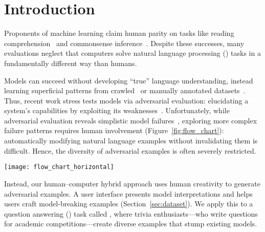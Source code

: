 \section{Introduction}
\label{sec:introduction}

Proponents of machine learning claim human
parity on tasks like reading comprehension~\cite{yu2018qanet}
and commonsense
inference~\cite{devlin2018BERT}. Despite these successes,
many evaluations neglect that computers solve natural language
processing () tasks 
in a fundamentally different way than humans.  

Models can succeed without developing ``true'' language understanding,
instead learning superficial patterns from
crawled~\cite{chen2016thorough} or manually annotated
datasets~\cite{kaushik2018reading,gururangan2018annotation}.  Thus,
recent work stress tests models via adversarial evaluation:
elucidating a system's capabilities by exploiting its
weaknesses~\cite{jia2017adversarial,belinkov2019survey}.
Unfortunately, while adversarial evaluation reveals simplistic model
failures~\cite{ribeiro2018sear,mudrakarta2018understand}, exploring
more complex failure patterns requires human involvement (Figure~\ref{fig:flow_chart}):
automatically modifying natural language examples
without invalidating them is difficult. Hence, the diversity
of adversarial examples is often severely restricted.
	
\begin{figure*}[t]
\centering
\texttt{[image: flow\_chart\_horizontal]}
\caption{Adversarial evaluation in  typically focuses on a specific
  phenomenon (e.g., word replacements) and then generates the corresponding examples (top).
  Consequently, adversarial examples are limited to
  the diversity of what the underlying generative model or perturbation rule can produce and also require downstream
  human evaluation to ensure validity. Our setup (bottom) instead has
  human-authored examples, using human--computer collaboration to craft adversarial examples with greater diversity.}
\label{fig:flow_chart}
\end{figure*}

Instead, our human--computer hybrid approach uses human creativity to
generate adversarial examples.  A user interface presents model
interpretations and helps users craft model-breaking examples
(Section~\ref{sec:dataset}).  We apply this to a question answering
() task called \qb{}, where trivia enthusiasts---who write
questions for academic competitions---create diverse examples
that stump existing  models.

